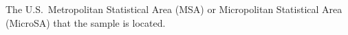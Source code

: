 The U.S.~Metropolitan Statistical Area (MSA) or Micropolitan Statistical Area (MicroSA) that the sample is located.

